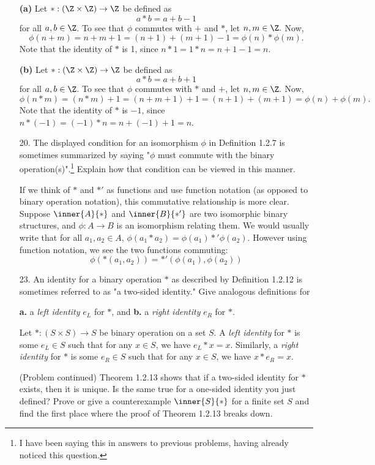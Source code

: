 \documentclass[letterpaper]{article}
\begin{document}
\begin{enumerate}
\answer \textbf{(a)} Let $*:(\Z\times\Z)\to\Z$ be defined as $$a*b=a+b-1$$ for all $a,b\in\Z$. To see that $\phi$ commutes with $+$ and $*$, let $n,m\in\Z.$ Now, 
$$\phi(n+m)=n+m+1=(n+1)+(m+1)-1=\phi(n)*\phi(m).$$
Note that the identity of $*$ is 1, since $n*1=1*n=n+1-1=n$. 

\answer \textbf{(b)} Let $*:(\Z\times\Z)\to\Z$ be defined as $$a*b=a+b+1$$ for all $a,b\in\Z$. To see that $\phi$ commutes with $*$ and $+$, let $n,m\in\Z.$ Now, 
$$\phi(n*m)=(n*m)+1=(n+m+1)+1=(n+1)+(m+1)=\phi(n)+\phi(m).$$
Note that the identity of $*$ is $-1$, since $n*(-1)=(-1)*n=n+(-1)+1=n$. 

\item[20.] The displayed condition for an isomorphism $\phi$ in Definition 1.2.7 is sometimes summarized by saying "$\phi$ must commute with the binary operation(s)".\footnote{I have been saying this in answers to previous problems, having already noticed this question.} Explain how that condition can be viewed in this manner. 

\answer If we think of $*$ and $*'$ as functions and use function notation (as opposed to binary operation notation), this commutative relationship is more clear. Suppose $\inner{A}{*}$ and $\inner{B}{*'}$ are two isomorphic binary structures, and $\phi:A\to B$ is an isomorphism relating them. We would usually write that for all $a_1, a_2 \in A$, 
$\phi(a_1*a_2)=\phi(a_1)*'\phi(a_2).$ However using function notation, we see the two functions commuting:
$$\phi(*(a_1,a_2))=*'(\phi(a_1),\phi(a_2))$$

\item[23.] An identity for a binary operation $*$ as described by Definition 1.2.12 is sometimes referred to as "a two-sided identity." Give analogous definitions for 

\textbf{a.} a \emph{left identity} $e_L$ for $*$, \quad\quad and \quad\quad \textbf{b.} a \emph{right identity} $e_R$ for $*$. 

\answer Let $*:(S\times S)\to S$ be binary operation on a set $S$. A \emph{left identity} for $*$ is some $e_L\in S$ such that for any $x\in S$, we have $e_L*x=x$. Similarly, a \emph{right identity} for $*$ is some $e_R\in S$ such that for any $x\in S$, we have $x*e_R=x$. \qedwhite

(Problem continued) Theorem 1.2.13 shows that if a two-sided identity for $*$ exists, then it is unique. Is the same true for a one-sided identity you just defined? Prove or give a counterexample $\inner{S}{*}$ for a finite set $S$ and find the first place where the proof of Theorem 1.2.13 breaks down. 


\end{enumerate}
\end{document}
